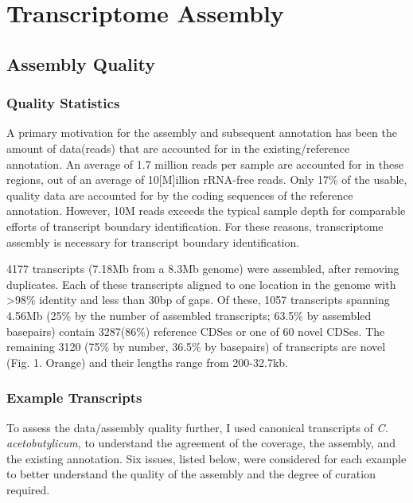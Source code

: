 

\section{Transcriptome Assembly}

\subsection{Assembly Quality}

\subsubsection{Quality Statistics}


A primary motivation for the assembly and subsequent annotation has been the amount of data(reads) that are accounted for in the existing/reference annotation. An average of 1.7 million reads per sample are accounted for in these regions, out of an average of 10[M]illion rRNA-free reads.  Only 17\% of the usable, quality data are accounted for by the coding sequences of the reference annotation. However, 10M reads exceeds the typical sample depth for comparable efforts of transcript boundary identification. For these reasons, transcriptome assembly is necessary for transcript boundary identification.

4177 transcripts (7.18Mb from a 8.3Mb genome) were assembled, after removing duplicates. Each of these transcripts aligned to one location in the genome with \textgreater 98\% identity and less than 30bp of gaps. Of these, 1057 transcripts spanning 4.56Mb (25\% by the number of assembled transcripts;  63.5\% by assembled basepairs) contain 3287(86\%) reference CDSes or one of 60 novel CDSes.  The remaining 3120 (75\% by number, 36.5\% by basepairs) of transcripts are novel (Fig. 1. Orange) and their lengths range from 200-32.7kb.


\subsubsection{Example Transcripts}


To assess the data/assembly quality further, I used canonical transcripts of \textit{C. acetobutylicum}, to understand the agreement of the coverage, the assembly, and the existing annotation. Six issues, listed below, were considered for each example to better understand the quality of the assembly and the degree of curation required. 

